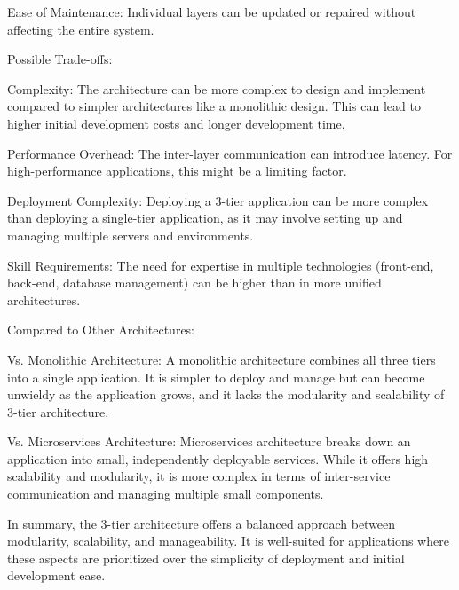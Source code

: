 Ease of Maintenance: Individual layers can be updated or repaired without affecting the entire system.

Possible Trade-offs:

Complexity: The architecture can be more complex to design and implement compared to simpler architectures like a monolithic design. This can lead to higher initial development costs and longer development time.

Performance Overhead: The inter-layer communication can introduce latency. For high-performance applications, this might be a limiting factor.

Deployment Complexity: Deploying a 3-tier application can be more complex than deploying a single-tier application, as it may involve setting up and managing multiple servers and environments.

Skill Requirements: The need for expertise in multiple technologies (front-end, back-end, database management) can be higher than in more unified architectures.

Compared to Other Architectures:

Vs. Monolithic Architecture: A monolithic architecture combines all three tiers into a single application. It is simpler to deploy and manage but can become unwieldy as the application grows, and it lacks the modularity and scalability of 3-tier architecture.

Vs. Microservices Architecture: Microservices architecture breaks down an application into small, independently deployable services. While it offers high scalability and modularity, it is more complex in terms of inter-service communication and managing multiple small components.

In summary, the 3-tier architecture offers a balanced approach between modularity, scalability, and manageability. It is well-suited for applications where these aspects are prioritized over the simplicity of deployment and initial development ease.


